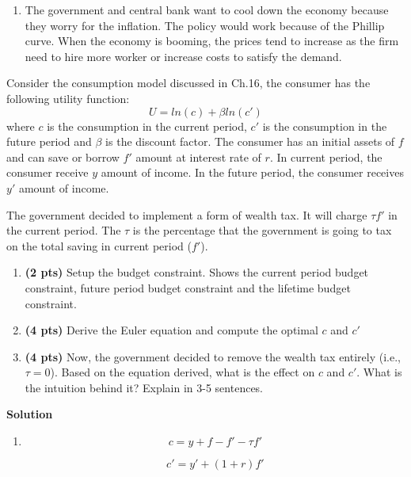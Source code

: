 \documentclass[addpoints,12pt,answers]{exam}
\begin{document}
\begin{questions}
\begin{enumerate}[label=(\alph*)]
			\vspace{1cm}
			\item The government and central bank want to cool down the economy because they worry for the inflation. The policy would work because of the Phillip curve. When the economy is booming, the prices tend to increase as the firm need to hire more worker or increase costs to satisfy the demand.
		\end{enumerate}
		\clearpage
		\question Consider the consumption model discussed in Ch.16, the consumer has the following utility function:
		\[U = ln(c) + \beta ln(c')\]
		where $c$ is the consumption in the current period, $c'$ is the consumption in the future period and $\beta$ is the discount factor. The consumer has an initial assets of $f$ and can save or borrow $f'$ amount at interest rate of $r$. In current period, the consumer receive $y$ amount of income. In the future period, the consumer receives $y'$ amount of income. 
		
		The government decided to implement a form of wealth tax. It will charge $\tau f'$ in the current period. The $\tau$ is the percentage that the government is going to tax on the total saving in current period ($ f'$).
		
		\begin{enumerate}[label=(\alph*)]
			\item \textbf{(2 pts)} 	Setup the budget constraint. Shows the current period budget constraint, future period budget constraint and the lifetime budget constraint.
			
			\item \textbf{(4 pts)}  Derive the Euler equation and compute the optimal $c$ and $c'$ 
			

			
			\item \textbf{(4 pts)}  Now, the government decided to remove the wealth tax entirely (i.e., $\tau = 0$). Based on the equation derived, what is the effect on $c$ and $c'$. What is the intuition behind it? Explain in 3-5 sentences.
			
		\end{enumerate}
		
		\clearpage
		\textbf{Solution}
		\begin{enumerate}[label=(\alph*)]
			\item 			
			\[c= y+f-f' -\tau f'\]
			
			\[c'=y'+(1+r)f'\]
			

\end{enumerate}
\end{questions}
\end{document}
